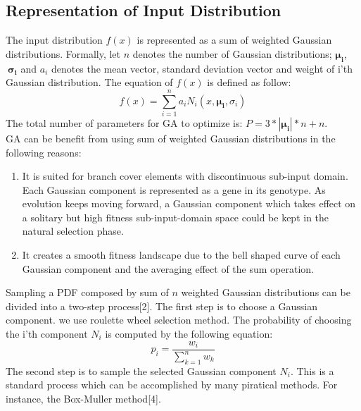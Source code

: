 \documentclass[conference]{IEEEtran}
\renewcommand{\vec}[1]{\mathbf{#1}}
\begin{document}
\subsection{Representation of Input Distribution}

The input distribution \(f(x)\) is represented as a sum of weighted Gaussian distributions. Formally, let \(n\) denotes the number of Gaussian distributions; \(\vec{\mu_i}\), \(\ \vec{\sigma_i}\) and \(a_i\) denotes the mean vector, standard deviation vector and weight of i'th Gaussian distribution. The equation of \(f(x)\) is defined as follow:\[f(x) = \sum_{i=1}^{n}a_iN_i(x,\vec{\mu_i},\sigma_i)\] The total number of parameters for GA to optimize is: \(P = 3*|\vec{\mu_i}|*n + n\).\\

GA can be benefit from using sum of weighted Gaussian distributions in the following reasons:
\begin{enumerate}
	\item It is suited for branch cover elements with discontinuous sub-input domain. Each Gaussian component is represented as a gene in its genotype. As evolution keeps moving forward, a Gaussian component which takes effect on a solitary but high fitness sub-input-domain space could be kept in the natural selection phase.\\
	\item It creates a smooth fitness landscape due to the bell shaped curve of each Gaussian component and the averaging effect of the sum operation. \\ 
\end{enumerate}

Sampling a PDF composed by sum of \(n\) weighted Gaussian distributions can be divided into a two-step process{[2]}.
The first step is to choose a Gaussian component. we use roulette wheel selection method. The probability of choosing the i'th component \(N_i\) is computed by the following equation:\[p_i = \frac{w_i}{\sum_{k=1}^{n}w_k}\] The second step is to sample the selected Gaussian component \(N_i\). This is a standard process which can be accomplished by many piratical methods. For instance, the Box-Muller method{[4]}.
\end{document}
